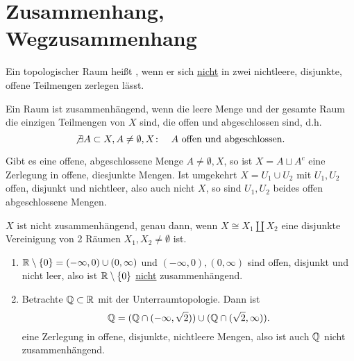 
\section{Zusammenhang, Wegzusammenhang}

\begin{definition}[Zusammenhang]\label{def:zusammenhang}
    Ein topologischer Raum heißt , wenn er sich \underline{nicht} in zwei nichtleere, disjunkte, offene Teilmengen zerlegen lässt. 
\end{definition}

\begin{dlemma}\label{lm:raum-ist-zusammenhängend-gdw-offen-abgeschlossene-mengen-sind-trivial}
    Ein Raum ist zusammenhängend, wenn die leere Menge und der gesamte Raum die einzigen Teilmengen von $X$ sind, die offen und abgeschlossen sind, d.h.
     \[
    \not \exists  A\subset X, A\neq \emptyset,X \colon \quad A \text{ offen und abgeschlossen}
    .\] 
\end{dlemma}

\begin{proof*}
    Gibt es eine offene, abgeschlossene Menge $A\neq \emptyset,X$, so ist $X = A \sqcup A^{c}$ eine Zerlegung in offene, diesjunkte Mengen. Ist umgekehrt $X = U_1 \cup U_2$ mit $U_1,U_2$ offen, disjunkt und nichtleer, also auch nicht $X$, so sind $U_1,U_2$ beides offen abgeschlossene Mengen.
\end{proof*}

\begin{remark}
    $X$ ist nicht zusammenhängend, genau dann, wenn  $X \cong X_1 \coprod X_2$ eine disjunkte Vereinigung von 2 Räumen $X_1,X_2\neq \emptyset$ ist.
\end{remark}

\begin{example}
    \begin{enumerate}[1)]
        \item $\mathbb{R}\setminus \left \{0\right\}  = (-\infty,0) \cup (0,\infty)$ und $(-\infty,0),(0,\infty)$ sind offen, disjunkt und nicht leer, also ist $\mathbb{R}\setminus \left \{0\right\} $ \underline{nicht} zusammenhängend. 
        \item Betrachte $\mathbb{Q}\subset \mathbb{R}$ mit der Unterraumtopologie. Dann ist
            \[
                \mathbb{Q} = (\mathbb{Q} \cap (-\infty,\sqrt{2})) \cup (\mathbb{Q} \cap (\sqrt{2},\infty))  
            .\] 
            eine Zerlegung in offene, disjunkte, nichtleere Mengen, also ist auch $\mathbb{Q}$ nicht zusammenhängend.
    \end{enumerate}
\end{example}


